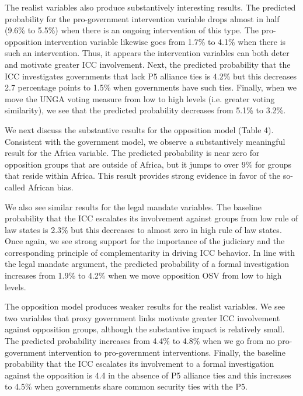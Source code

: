 The realist variables also produce substantively interesting results. The predicted probability for the pro-government intervention variable drops almost in half (9.6\% to 5.5\%) when there is an ongoing intervention of this type. The pro-opposition intervention variable likewise goes from 1.7\% to 4.1\% when there is such an intervention.  Thus, it appears the intervention variables can both deter and motivate greater ICC involvement. Next, the predicted probability that the ICC investigates governments that lack P5 alliance ties is 4.2\% but this decreases 2.7 percentage points to 1.5\% when governments have such ties. Finally, when we move the UNGA voting measure from low to high levels (i.e. greater voting similarity), we see that the predicted probability decreases from 5.1\% to 3.2\%.

We next discuss the substantive results for the opposition model (Table 4).  Consistent with the government model, we observe a substantively meaningful result for the Africa variable.  The predicted probability is near zero for opposition groups that are outside of Africa, but it jumps to over 9\% for groups that reside within Africa. This result provides strong evidence in favor of the so-called African bias.

We also see similar results for the legal mandate variables.   The baseline probability that the ICC escalates its involvement against groups from low rule of law states is 2.3\% but this decreases to almost zero in high rule of law states. Once again, we see strong support for the importance of the judiciary and the corresponding principle of complementarity in driving ICC behavior.  In line with the legal mandate argument, the predicted probability of a formal investigation increases from 1.9\% to 4.2\% when we move opposition OSV from low to high levels.

The opposition model produces weaker results for the realist variables. We see two variables that proxy government links motivate greater ICC involvement against opposition groups, although the substantive impact is relatively small. The predicted probability increases from 4.4\% to 4.8\% when we go from no pro-government intervention to pro-government interventions. Finally, the baseline probability that the ICC escalates its involvement to a formal investigation against the opposition is 4.4 in the absence of P5 alliance ties and this increases to 4.5\% when governments share common security ties with the P5.
